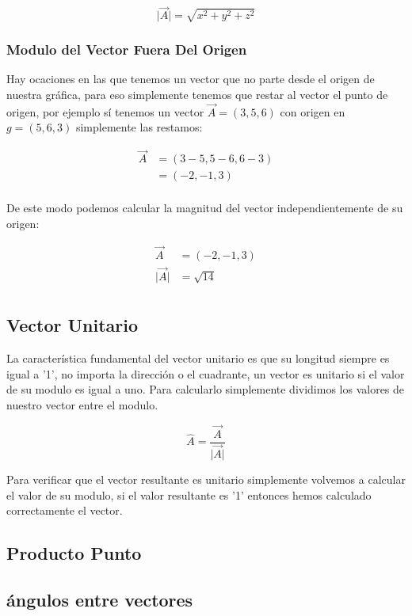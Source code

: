 \documentclass{article}
\begin{document}
\[
\vert\vec{A}\vert = \sqrt{ x^2 + y^2 + z^2 }
\]

\subsubsection*{Modulo del Vector Fuera Del Origen}
\label{sec:orgaf688d8}
Hay ocaciones en las que tenemos un vector que no parte desde el origen de nuestra gráfica, para eso simplemente tenemos que restar al vector el punto de origen, por ejemplo sí tenemos un vector \(\vec{A} = (3,5,6)\) con origen en \(g = (5,6,3)\) simplemente las restamos:

\[ \begin{aligned}
\vec{A} &= (3-5,5-6,6-3) \\
~ &= (-2,-1,3) \\
\end{aligned} \]

De este modo podemos calcular la magnitud del vector independientemente de su origen:

\[ \begin{aligned}
\vec{A} &= (-2,-1,3) \\
\vert\vec{A}\vert &= \sqrt{14} \\
\end{aligned} \]

\subsection{Vector Unitario}
\label{sec:org8ad57db}
La característica fundamental del vector unitario es que su longitud siempre es igual a '1', no importa la dirección o el cuadrante, un vector es unitario si el valor de su modulo es igual a uno. Para calcularlo simplemente dividimos los valores de nuestro vector entre el modulo.

\[ 
\hat{A} = \frac{\vec{A}}{\vert\vec{A}\vert} 
\]

Para verificar que el vector resultante es unitario simplemente volvemos a calcular el valor de su modulo, si el valor resultante es '1' entonces hemos calculado correctamente el vector.

\subsection{Producto Punto}
\label{sec:orge6db255}

\subsection{ángulos entre vectores}
\label{sec:org8007025}
\end{document}
